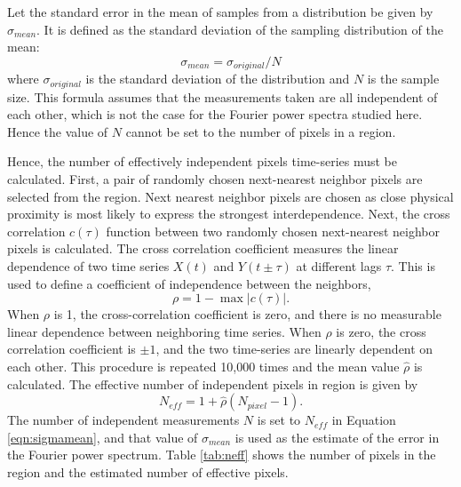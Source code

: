 \documentclass{aastex}
\newcommand{\PS}{power spectrum}
\newcommand{\Fps}{Fourier \PS}
\begin{document}
Let the standard error in the mean of samples from a distribution be
given by $\sigma_{mean}$.  It is defined as the standard deviation of
the sampling distribution of the mean:
\begin{equation}
\sigma_{mean} = \sigma_{original} / N
\label{eqn:sigmamean}
\end{equation}
where $\sigma_{original}$ is the standard deviation of the
distribution and $N$ is the sample size.  This formula assumes that
the measurements taken are all independent of each other, which is not
the case for the Fourier power spectra studied here.  Hence the value
of $N$ cannot be set to the number of pixels in a region.

Hence, the number of effectively independent pixels time-series must
be calculated.  First, a pair of randomly chosen next-nearest neighbor
pixels are selected from the region.  Next nearest neighbor pixels are
chosen as close physical proximity is most likely to express the
strongest interdependence.  Next, the cross correlation $c(\tau)$
function between two randomly chosen next-nearest neighbor pixels is
calculated.  The cross correlation coefficient measures the linear
dependence of two time series $X(t)$ and $Y(t \pm \tau)$ at different
lags $\tau$.  This is used to define a coefficient of independence
between the neighbors,
\begin{equation}
\label{eqn:ind}
\rho = 1 - \max|c(\tau)|.
\end{equation}
When $\rho$ is 1, the cross-correlation coefficient is zero, and there
is no measurable linear dependence between neighboring time series.
When $\rho$ is zero, the cross correlation coefficient is $\pm 1$, and
the two time-series are linearly dependent on each other.  This
procedure is repeated 10,000 times and the mean value $\hat{\rho}$ is
calculated. The effective number of independent pixels in region is
given by
\begin{equation}
\label{eqn:nind}
N_{eff}= 1 + \hat{\rho}(N_{pixel}-1).
\end{equation}
The number of independent measurements $N$ is set to $N_{eff}$ in
Equation \ref{eqn:sigmamean}, and that value of $\sigma_{mean}$ is
used as the estimate of the error in the \Fps.  Table \ref{tab:neff}
shows the number of pixels in the region and the estimated number of
effective pixels.
\end{document}
